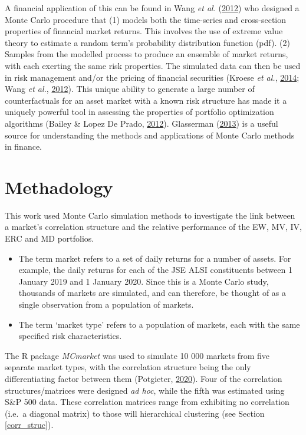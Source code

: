 \documentclass[11pt,preprint, authoryear]{elsarticle}
\numberwithin{equation}{section}
\numberwithin{figure}{section}
\numberwithin{table}{section}
\def\tightlist{} %
\begin{document}
A financial application of this can be found in Wang \emph{et al.}
(\protect\hyperlink{ref-wang2012}{2012}) who designed a Monte Carlo
procedure that (1) models both the time-series and cross-section
properties of financial market returns. This involves the use of extreme
value theory to estimate a random term's probability distribution
function (pdf). (2) Samples from the modelled process to produce an
ensemble of market returns, with each exerting the same risk properties.
The simulated data can then be used in risk management and/or the
pricing of financial securities (Kroese \emph{et al.},
\protect\hyperlink{ref-kroese2014}{2014}; Wang \emph{et al.},
\protect\hyperlink{ref-wang2012}{2012}). This unique ability to generate
a large number of counterfactuals for an asset market with a known risk
structure has made it a uniquely powerful tool in assessing the
properties of portfolio optimization algorithms (Bailey \& Lopez De
Prado, \protect\hyperlink{ref-lopez2012}{2012}). Glasserman
(\protect\hyperlink{ref-glasserman2013}{2013}) is a useful source for
understanding the methods and applications of Monte Carlo methods in
finance.

\hypertarget{methadology}{%
\section{\texorpdfstring{Methadology
\label{methadology}}{Methadology }}\label{methadology}}

This work used Monte Carlo simulation methods to investigate the link
between a market's correlation structure and the relative performance of
the EW, MV, IV, ERC and MD portfolios.

\begin{itemize}
\tightlist
\item
  The term market refers to a set of daily returns for a number of
  assets. For example, the daily returns for each of the JSE ALSI
  constituents between 1 January 2019 and 1 January 2020. Since this is
  a Monte Carlo study, thousands of markets are simulated, and can
  therefore, be thought of as a single observation from a population of
  markets.
\item
  The term `market type' refers to a population of markets, each with
  the same specified risk characteristics.
\end{itemize}

The R package \emph{MCmarket} was used to simulate 10 000 markets from
five separate market types, with the correlation structure being the
only differentiating factor between them (Potgieter,
\protect\hyperlink{ref-MCmarket}{2020}). Four of the correlation
structures/matrices were designed \emph{ad hoc}, while the fifth was
estimated using S\&P 500 data. These correlation matrices range from
exhibiting no correlation (i.e.~a diagonal matrix) to those will
hierarchical clustering (see Section \ref{corr_struc}).
\end{document}
